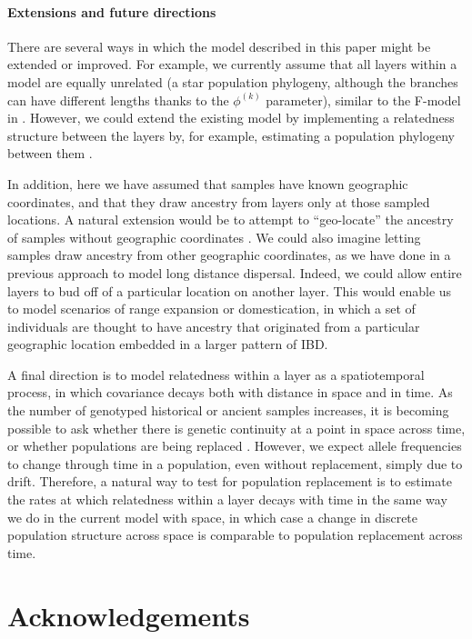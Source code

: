 \documentclass[12pt]{article}
\begin{document}
\paragraph{Extensions and future directions}
There are several ways in which the model described in this paper might be extended or improved.  
For example, we currently assume that all layers within a model are equally unrelated 
(a star population phylogeny, although the branches can have different lengths thanks to the $\phi^{(k)}$ parameter), 
similar to the F-model in \citep{falush2003}.
However, we could extend the existing model by implementing 
a relatedness structure between the layers by, for example, 
estimating a population phylogeny between them
\citep[e.g.][]{treemix}.

In addition, here we have assumed that samples have known geographic coordinates, 
and that they draw ancestry from layers only at those sampled locations. 
A natural extension would be to attempt to ``geo-locate'' 
the ancestry of samples without geographic coordinates \citep{Wasser2004}. 
We could also imagine letting samples draw ancestry from other geographic coordinates, 
as we have done in a previous approach \citep{spacemix} to model long distance dispersal. 
Indeed, we could allow entire layers to bud off of a particular location on another layer. 
This would enable us to model scenarios of range expansion or domestication, 
in which a set of individuals are thought to have ancestry that originated from
a particular geographic location embedded in a larger pattern of IBD.

A final direction is to model relatedness within a layer as a spatiotemporal process, 
in which covariance decays both with distance in space and in time.  
As the number of genotyped historical or ancient samples increases, 
it is becoming possible to ask whether there is genetic continuity at a point in space across time, 
or whether populations are being replaced \citep{lazaridis_ancient_2014, Haak2015, slatkin_racimo2016, Nielsen2017, Schraiber2017}.
However, we expect allele frequencies to change through time in a population, 
even without replacement, simply due to drift.
Therefore, a natural way to test for population replacement is to estimate the rates 
at which relatedness within a layer decays with time in the same way we do in the current model with space, 
in which case a change in discrete population structure across space is comparable to population replacement across time.

\section*{Acknowledgements}
\end{document}
